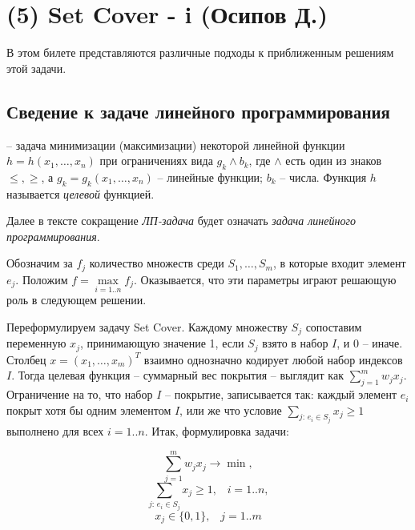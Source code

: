 \hypertarget{setcover}{\section{(5) Set Cover - i (Осипов Д.)}}


В этом билете представляются различные подходы к приближенным решениям этой задачи. 

\subsection{Сведение к задаче линейного программирования}

 -- задача минимизации (максимизации) некоторой линейной функции $h = h(x_1, \ldots, x_n)$ при ограничениях вида $g_k \land b_k$, где $\land$ есть один из знаков $\leq, \geq$, а $g_k = g_k(x_1, \ldots, x_n)$ -- линейные функции; $b_k$ -- числа. Функция $h$ называется \textit{целевой} функцией.

Далее в тексте сокращение \textit{ЛП-задача} будет означать \textit{задача линейного программирования}.

Обозначим за $f_j$ количество множеств среди $S_1, \ldots, S_m$, в которые входит элемент $e_j$. Положим $f = \max\limits_{i=1..n} f_j$. Оказывается, что эти параметры играют решающую роль в следующем решении.

Переформулируем задачу Set Cover. Каждому множеству $S_j$ сопоставим переменную $x_j$, принимающую значение 1, если $S_j$ взято в набор $I$, и 0 -- иначе. Столбец $x = (x_1, \ldots, x_m)^T$ взаимно однозначно кодирует любой набор индексов $I$. Тогда целевая функция -- суммарный вес покрытия -- выглядит как $\sum\limits_{j=1}^m w_j x_j$. Ограничение на то, что набор $I$ -- покрытие, записывается так: каждый элемент $e_i$ покрыт хотя бы одним элементом $I$, или же что условие $\sum\limits_{j:\, e_i \in S_j} x_j \geq 1$ выполнено для всех $i=1..n$. Итак, формулировка задачи:

$$\sum_{j=1}^m w_j x_j \rightarrow \min,$$
$$\sum_{j:\, e_i \in S_j} x_j \geq 1, \;\;\; i=1..n,$$
$$x_j \in \{0, 1\}, \;\;\; j=1..m$$

